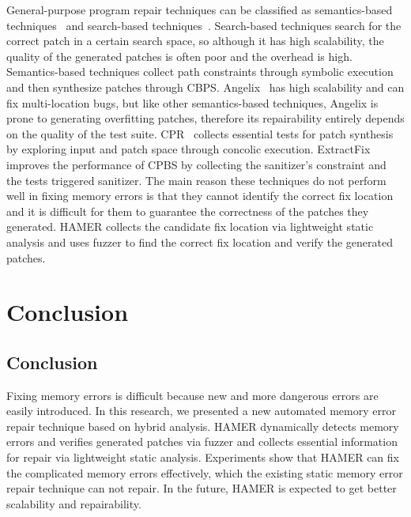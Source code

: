 \documentclass[a4paper,11pt,oneside,openany]{book}
\begin{document}
General-purpose program repair techniques can be classified as semantics-based techniques~\cite{jfix,semfix,directfix,Angelix,Extractfix,CPR,acs} and search-based techniques~\cite{par,s3, spr, prophet,cp}. Search-based techniques search for the correct patch in a certain search space, so although it has high scalability, the quality of the generated patches is often poor and the overhead is high. Semantics-based techniques collect path constraints through symbolic execution and then synthesize patches through CBPS. Angelix~\cite{Angelix} has high scalability and can fix multi-location bugs, but like other semantics-based techniques, Angelix is prone to generating overfitting patches, therefore its repairability entirely depends on the quality of the test suite. CPR~\cite{CPR} collects essential tests for patch synthesis by exploring input and patch space through concolic execution. ExtractFix~\cite{Extractfix} improves the performance of CPBS by collecting the sanitizer's constraint and the tests triggered sanitizer. The main reason these techniques do not perform well in fixing memory errors is that they cannot identify the correct fix location and it is difficult for them to guarantee the correctness of the patches they generated. HAMER collects the candidate fix location via lightweight static analysis and uses fuzzer to find the correct fix location and verify the generated patches.


\chapter{Conclusion}
\label{conclusion}
\section{Conclusion}
Fixing memory errors is difficult because new and more dangerous errors are easily introduced. In this research, we presented a new automated memory error repair technique based on hybrid analysis. HAMER dynamically detects memory errors and verifies generated patches via fuzzer and collects essential information for repair via lightweight static analysis. Experiments show that HAMER can fix the complicated memory errors effectively, which the existing static memory error repair technique can not repair. In the future, HAMER is expected to get better scalability and repairability.
\end{document}
